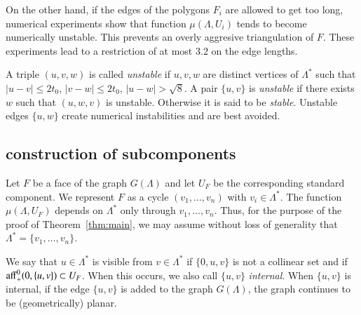 On the other hand, if the edges of the polygons $F_i$ are allowed
to get too long, numerical experiments show that function $\mu(\Lambda,U_i)$
tends to become numerically unstable.  This prevents 
an overly aggresive  triangulation of $F$.
These experiments lead
 to a restriction of at most $3.2$ on the edge lengths.

A triple $(u,v,w)$ is called {\it unstable}
if $u,v,w$ are distinct vertices of $\Lambda^*$ such
that $|u-v|\le 2t_0$, $|v-w|\le 2t_0$, $|u-w|>\sqrt8$.
A pair $\{u,v\}$ is {\it unstable} if there exists $w$ such that $(u,w,v)$
is unstable.  Otherwise it is said to be {\it stable}.
Unstable edges $\{u,w\}$ create
 numerical instabilities and are best avoided.


\subsection{construction of subcomponents}

Let $F$ be a face of the graph $G(\Lambda)$ and let $U_F$ be the
corresponding standard component.  We represent $F$ as a cycle
$(v_1,\ldots,v_n)$ with $v_i\in\Lambda^*$.  The function
$\mu(\Lambda,U_F)$ depends  on $\Lambda^*$ only through
$v_1,\ldots,v_n$.  Thus, for the purpose of the proof of
Theorem~\ref{thm:main}, we may assume without loss of generality
that $\Lambda^* = \{v_1,\ldots,v_n\}$.

We say that $u\in\Lambda^*$ is visible from $v\in\Lambda^*$ if
$\{0,u,v\}$ is not a collinear set and if
${\operatorname{aff}}_+^0(0,\{u,v\})\subset U_F$.  When this occurs, we
also call $\{u,v\}$ {\it internal}.  When $\{u,v\}$
is  internal, if the edge $\{u,v\}$ is added to the
graph $G(\Lambda)$, the graph continues to be (geometrically) planar.



